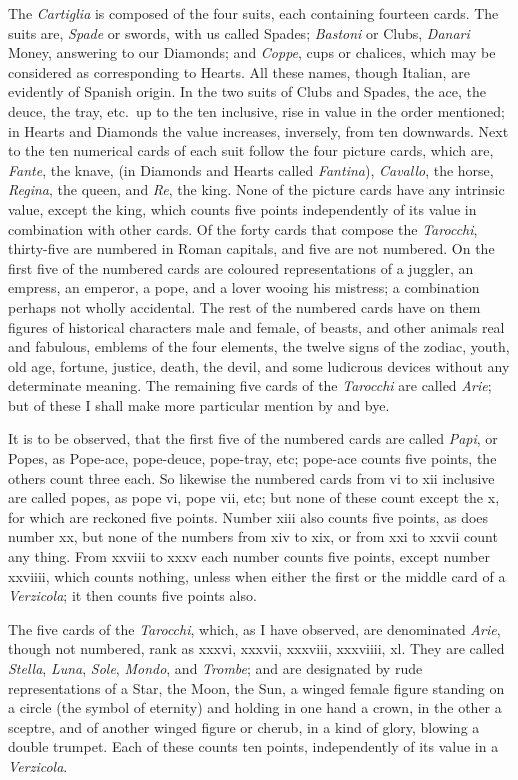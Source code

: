 \documentclass[11pt,a5paper]{article}
\begin{document}
The \textit{Cartiglia} is composed of the four suits, each containing fourteen cards.  The suits are, \textit{Spade} or swords, with us called Spades; \textit{Bastoni} or Clubs, \textit{Danari} Money, answering to our Diamonds; and \textit{Coppe}, cups or chalices, which may be considered as corresponding to Hearts.
All these names, though Italian, are evidently of Spanish origin.
In the two suits of Clubs and Spades, the ace, the deuce, the tray, etc.\ up to the ten inclusive, rise in value in the order mentioned; in Hearts and Diamonds the value increases, inversely, from ten downwards.
Next to the ten numerical cards of each suit follow the four picture cards, which are, \textit{Fante}, the knave, (in Diamonds and Hearts called \textit{Fantina}), \textit{Cavallo}, the horse, \textit{Regina}, the queen, and \textit{Re}, the king.
None of the picture cards have any intrinsic value, except the king, which counts five points independently of its value in combination with other cards.
Of the forty cards that compose the \textit{Tarocchi}, thirty-five are numbered in Roman capitals, and five are not numbered.  On the first five of the numbered cards are coloured representations of a juggler, an empress, an emperor, a pope, and a lover wooing his mistress; a combination perhaps not wholly accidental.
The rest of the numbered cards have on them figures of historical characters male and female, of beasts, and other animals real and fabulous, emblems of the four elements, the twelve signs of the zodiac, youth, old age, fortune, justice, death, the devil, and some ludicrous devices without any determinate meaning.
The remaining five cards of the \textit{Tarocchi} are called \textit{Arie}; but of these I shall make more particular mention by and bye.

It is to be observed, that the first five of the numbered cards are called \textit{Papi}, or Popes, as Pope-ace, pope-deuce, pope-tray, etc; pope-ace counts five points, the others count three each.
So likewise the numbered cards from vi to xii inclusive are called popes, as pope vi, pope vii, etc; but none of these count except the x, for which are reckoned five points.
Number xiii also counts five points, as does number xx, but none of the numbers from xiv to xix, or from xxi to xxvii count any thing.
From xxviii to xxxv each number counts five points, except number xxviiii, which counts nothing, unless when either the first or the middle card of a \textit{Verzicola}; it then counts five points also.

The five cards of the \textit{Tarocchi}, which, as I have observed, are denominated \textit{Arie}, though not numbered, rank as xxxvi, xxxvii, xxxviii, xxxviiii, xl.  They are called \textit{Stella}, \textit{Luna}, \textit{Sole}, \textit{Mondo}, and \textit{Trombe}; and are designated by rude representations of a Star, the Moon, the Sun, a winged female figure standing on a circle (the symbol of eternity) and holding in one hand a crown, in the other a sceptre, and of another winged figure or cherub, in a kind of glory, blowing a double trumpet.
Each of these counts ten points, independently of its value in a \textit{Verzicola}.
\end{document}
